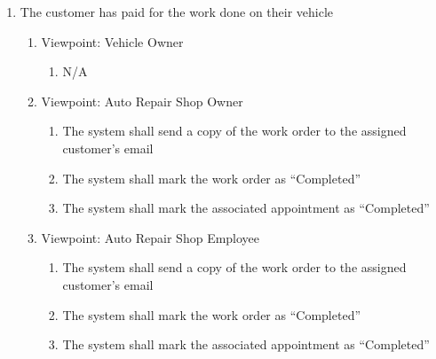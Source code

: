 \documentclass[12pt]{article}
\begin{document}
\begin{enumerate}[resume*=business_events]
	\item The customer has paid for the work done on their vehicle
	      \begin{enumerate}[VP\arabic*.]
		      \item Viewpoint: Vehicle Owner
		            \begin{enumerate}
			            \item[] N/A
		            \end{enumerate}
		      \item Viewpoint: Auto Repair Shop Owner
		            \begin{enumerate}
			            \item The system shall send a copy of the work order to the assigned customer's email
			            \item The system shall mark the work order as ``Completed''
			            \item The system shall mark the associated appointment as ``Completed''
		            \end{enumerate}
		      \item Viewpoint: Auto Repair Shop Employee
		            \begin{enumerate}
			            \item The system shall send a copy of the work order to the assigned customer's email
			            \item The system shall mark the work order as ``Completed''
			            \item The system shall mark the associated appointment as ``Completed''
		            \end{enumerate}
	      \end{enumerate}


\end{enumerate}
\end{document}
